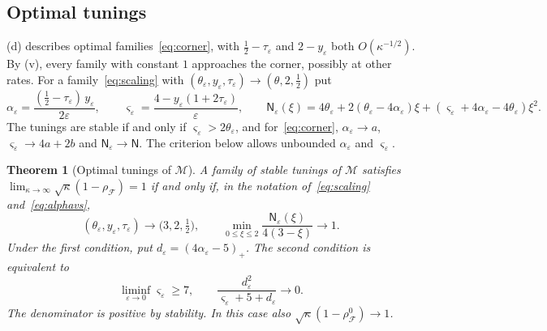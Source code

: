 \documentclass[11pt]{article}
\newtheorem{theorem}{Theorem}[section]
\theoremstyle{definition}
\theoremstyle{remark}
\newcommand{\cF}{\mathcal F}
\newcommand{\cM}{\mathcal M}
\newcommand{\rhoF}{\rho_{\cF}}
\newcommand{\rhoz}{\rho_{\cF}^{0}}
\begin{document}
\subsection{Optimal tunings}
\label{sec:optimal}

(d) describes optimal families~\eqref{eq:corner}, with
\(\frac12-\tau_\varepsilon\) and \(2-y_\varepsilon\) both \(O(\kappa^{-1/2})\).
  By (v), every family with constant \(1\)
approaches the corner, possibly at other rates.  For a family~\eqref{eq:scaling} with
\((\theta_\varepsilon,y_\varepsilon,\tau_\varepsilon)\to(\theta,2,\frac12)\) put
\begin{equation}\label{eq:alphavs}
\alpha_\varepsilon=\frac{(\frac12-\tau_\varepsilon)\,y_\varepsilon}{2\varepsilon},\qquad
\varsigma_\varepsilon=\frac{4-y_\varepsilon(1+2\tau_\varepsilon)}{\varepsilon},\qquad
\mathsf N_\varepsilon(\xi)=4\theta_\varepsilon+2(\theta_\varepsilon-4\alpha_\varepsilon)\xi+(\varsigma_\varepsilon+4\alpha_\varepsilon-4\theta_\varepsilon)\xi^2 .
\end{equation}
The tunings are stable if and only if \(\varsigma_\varepsilon>2\theta_\varepsilon\), and for~\eqref{eq:corner}, \(\alpha_\varepsilon\to a\),
\(\varsigma_\varepsilon\to4a+2b\) and \(\mathsf N_\varepsilon\to\mathsf N\).
The criterion below allows unbounded \(\alpha_\varepsilon\) and \(\varsigma_\varepsilon\).

\begin{theorem}[Optimal tunings of \(\cM\)]\label{thm:optimal}
A family of stable tunings of \(\cM\) satisfies \(\lim_{\kappa\to\infty}\sqrt\kappa(1-\rhoF)=1\) if and only if, in the
notation of~\eqref{eq:scaling} and~\eqref{eq:alphavs},
\[
(\theta_\varepsilon,y_\varepsilon,\tau_\varepsilon)\to\bigl(3,2,\tfrac12\bigr),\qquad
\min_{0\le\xi\le2}\frac{\mathsf N_\varepsilon(\xi)}{4(3-\xi)}\to1 .
\]
Under the first condition, put \(d_\varepsilon=(4\alpha_\varepsilon-5)_+\).
The second condition is equivalent to
\[
\liminf_{\varepsilon\to0}\varsigma_\varepsilon\ge7,\qquad
\frac{d_\varepsilon^2}{\varsigma_\varepsilon+5+d_\varepsilon}\to0.
\]
The denominator is positive by stability.  In this case also \(\sqrt\kappa(1-\rhoz)\to1\).
\end{theorem}
\end{document}
